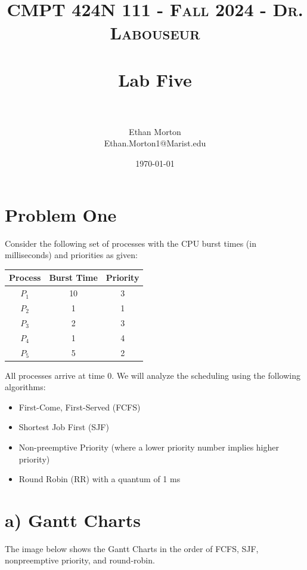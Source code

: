 \documentclass[letterpaper, 10pt,DIV=13]{scrartcl}
\title{	
   \normalfont \normalsize 
   \textsc{CMPT 424N 111 - Fall 2024 - Dr. Labouseur} \\[10pt] %
   \horrule{0.5pt} \\[0.25cm] 	%
   \huge Lab Five  \\     	    %
   \horrule{0.5pt} \\[0.25cm] 	%
}
\author{Ethan Morton \\ \normalsize Ethan.Morton1@Marist.edu}
\date{\normalsize\today} 	%
\numberwithin{equation}{section} %
\numberwithin{figure}{section} %
\numberwithin{table}{section} %
\begin{document}
\maketitle %

\section{Problem One}

Consider the following set of processes with the CPU burst times (in milliseconds) and priorities as given:

\begin{center}
\begin{tabular}{|c|c|c|}
\hline
Process & Burst Time & Priority \\
\hline
$P_1$ & 10 & 3 \\
$P_2$ & 1 & 1 \\
$P_3$ & 2 & 3 \\
$P_4$ & 1 & 4 \\
$P_5$ & 5 & 2 \\
\hline
\end{tabular}
\end{center}

All processes arrive at time 0. We will analyze the scheduling using the following algorithms:

\begin{itemize}
    \item First-Come, First-Served (FCFS)
    \item Shortest Job First (SJF)
    \item Non-preemptive Priority (where a lower priority number implies higher priority)
    \item Round Robin (RR) with a quantum of 1 ms
\end{itemize}

\section*{a) Gantt Charts}
The image below shows the Gantt Charts in the order of FCFS, SJF, nonpreemptive priority, and
round-robin.
\end{document}
